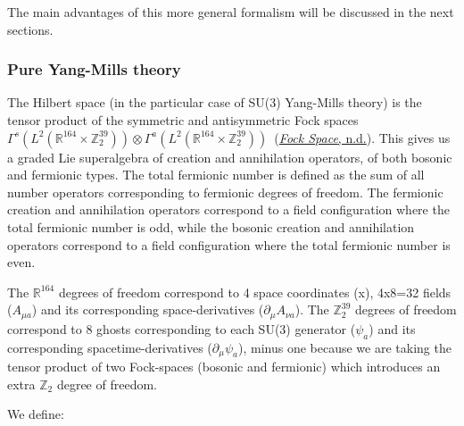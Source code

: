 \documentclass[11pt]{book}
\begin{document}
The main advantages of this more general formalism will be discussed in
the next sections.

\hypertarget{pure-yang-mills-theory}{%
\subsubsection{Pure Yang-Mills theory}\label{pure-yang-mills-theory}}

The Hilbert space (in the particular case of SU(3) Yang-Mills theory) is
the tensor product of the symmetric and antisymmetric Fock spaces
\(\Gamma^s(L^2(\mathbb{R}^{164}\times \mathbb{Z}_2^{39}))\otimes \Gamma^a(L^2(\mathbb{R}^{164}\times\mathbb{Z}_2^{39})) \)~\cite{Petz:1990gb}(\protect\hyperlink{ref-Fock}{\emph{Fock Space}, n.d.}). This
gives us a graded Lie superalgebra of creation and annihilation
operators, of both bosonic and fermionic types. The total fermionic
number is defined as the sum of all number operators corresponding to
fermionic degrees of freedom. The fermionic creation and annihilation
operators correspond to a field configuration where the total fermionic
number is odd, while the bosonic creation and annihilation operators
correspond to a field configuration where the total fermionic number is
even.

The \(\mathbb{R}^{164}\) degrees of freedom correspond to 4 space
coordinates (x), 4x8=32 fields (\(A_{\mu a}\)) and its corresponding
space-derivatives (\(\partial_{\mu}A_{\nu a}\)). The
\(\mathbb{Z}_2^{39}\) degrees of freedom correspond to 8 ghosts
corresponding to each SU(3) generator (\(\psi_{a}\)) and its
corresponding spacetime-derivatives (\(\partial_{\mu}\psi_{a}\)), minus
one because we are taking the tensor product of two Fock-spaces (bosonic
and fermionic) which introduces an extra \(\mathbb{Z}_2\) degree of
freedom.

We define:
\end{document}
